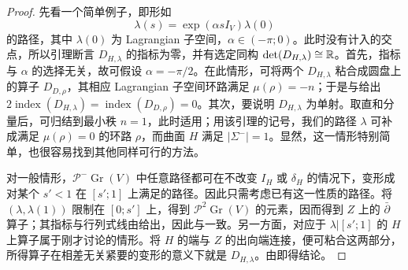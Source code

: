 \begin{proof}
先看一个简单例子，即形如
\begin{equation}\label{eq:11.21}
\lambda(s)=\exp(\alpha sI_V)\lambda(0)
\end{equation}
的路径，其中 $\lambda(0)$ 为 Lagrangian 子空间，$\alpha\in(-\pi;0)$。此时没有计入的交点，所以引理断言 $D_{H,\allowbreak \lambda}$ 的指标为零，并有选定同构 $\det(D_{H,\allowbreak \lambda})\cong\mathbb R$。首先，指标与 $\alpha$ 的选择无关，故可假设 $\alpha=-\pi/2$。在此情形，可将两个 $D_{H,\allowbreak \lambda}$ 粘合成圆盘上的算子 $D_{D,\allowbreak \rho}$，其相应 Lagrangian 子空间环路满足 $\mu(\rho)=-n$；于是与给出 $2\operatorname{index}(D_{H,\allowbreak \lambda})=\operatorname{index}(D_{D,\allowbreak \rho})=0$。其次，要说明 $D_{H,\allowbreak \lambda}$ 为单射。取直和分量后，可归结到最小秩 $n=1$，此时适用；用该引理的记号，我们的路径 $\lambda$ 可补成满足 $\mu(\rho)=0$ 的环路 $\rho$，而曲面 $H$ 满足 $|\Sigma^-|=1$。显然，这一情形特别简单，也很容易找到其他同样可行的方法。

对一般情形，$\mathcal P^-\operatorname{Gr}(V)$ 中任意路径都可在不改变 $I_H$ 或 $\delta_H$ 的情况下，变形成对某个 $s'<1$ 在 $[s';1]$ 上满足的路径。因此只需考虑已有这一性质的路径。将 $(\lambda,\allowbreak \lambda(1))$ 限制在 $[0;s']$ 上，得到 $\mathcal P^2\operatorname{Gr}(V)$ 的元素，因而得到 $Z$ 上的 $\bar\partial$ 算子；其指标与行列式线由给出，因此与一致。另一方面，对应于 $\lambda|[s';1]$ 的 $H$ 上算子属于刚才讨论的情形。将 $H$ 的端与 $Z$ 的出向端连接，便可粘合这两部分，所得算子在相差无关紧要的变形的意义下就是 $D_{H,\allowbreak \lambda}$。由即得结论。
\end{proof}

